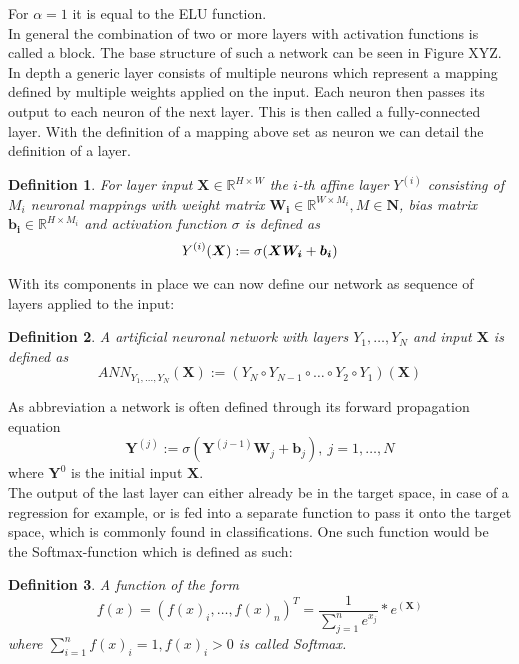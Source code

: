 \documentclass[a4paper,12pt,titlepage,enabledeprecatedfontcommands]{scrreprt}
\newtheorem{definition}{Definition}[chapter]
\begin{document}
For $\alpha=1$ it is equal to the ELU function. \\
In general the combination of two or more layers with activation functions is called a block. The base structure of such a network can be seen in Figure XYZ.  \\
In depth a generic layer consists of multiple neurons which represent a mapping defined by multiple weights applied on the input. Each neuron then passes its output to each neuron of the next layer. This is then called a fully-connected layer. With the definition of a mapping above set as neuron we can detail the definition of a layer. \\
\begin{definition}
For layer input $\bm{X} \in \mathbb{R}^{H\times W}$ the $i$-th affine layer $Y^{(i)}$ consisting of $M_i$ neuronal mappings with weight matrix $\bm{W_i} \in \mathbb{R}^{W\times M_i}, M \in  \bm{N}$, bias matrix $\bm{b_i} \in \mathbb{R}^{H\times M_i}$ and activation function $\sigma$ is defined as
\begin{equation}
Y^{(i)}(\bm{X}) := \sigma(\bm{X}\bm{W_i}+\bm{b_i}) \\
\end{equation}
\end{definition}
With its components in place we can now define our network as sequence of layers applied to the input: \\
\begin{definition}
A artificial neuronal network with layers $Y_1,\ldots,Y_N$ and input $\bm{X}$ is defined as
\begin{equation}
{ANN}_{Y_1,\ldots,Y_N}(\bm{X}) := (Y_N \circ Y_{N-1} \circ \ldots \circ Y_{2} \circ Y_{1})(\bm{X})
\end{equation}
\end{definition}
As abbreviation a network is often defined through its forward propagation equation \\
\begin{equation}
\bm{Y}^{(j)}:=\sigma(\bm{Y}^{(j-1)}\bm{W}_j+\bm{b}_j), \ j=1,\ldots,N
\end{equation}
where $\bm{Y}^{0}$ is the initial input $\bm{X}$.\\
The output of the last layer can either already be in the target space, in case of a regression for example, or is fed into a separate function to pass it onto the target space, which is commonly found in classifications. One such function would be the Softmax-function which is defined as such: 
\begin{definition}
A function of the form
\begin{equation}
f(x) = (f(x)_i, \ldots, f(x)_n)^T = \frac{1}{\sum_{j=1}^{n} e^{x_j}} * e^{(\bm{X})}
\end{equation}
where $\sum_{i=1}^{n} f(x)_i = 1, f(x)_i > 0$ is called Softmax.
\end{definition}
\end{document}
